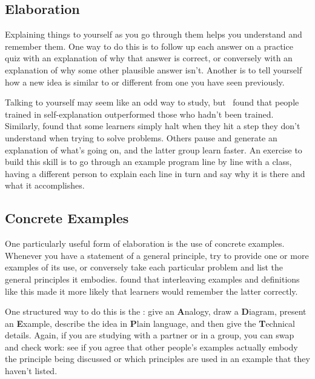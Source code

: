 \subsection*{Elaboration}

Explaining things to yourself as you go through them
helps you understand and remember them.
One way to do this is to follow up each answer on a practice quiz
with an explanation of why that answer is correct,
or conversely with an explanation of why some other plausible answer isn't.
Another is to tell yourself
how a new idea is similar to or different from one you have seen previously.

Talking to yourself may seem like an odd way to study,
but~\cite{Biel1995} found that
people trained in self-explanation outperformed those who hadn't been trained.
Similarly,
\cite{Chi1989} found that some learners simply halt when they hit a step they don't understand
when trying to solve problems.
Others pause and generate an explanation of what's going on,
and the latter group learn faster.
An exercise to build this skill is to go through an example program line by line with a class,
having a different person to explain each line in turn
and say why it is there and what it accomplishes.

\subsection*{Concrete Examples}

One particularly useful form of elaboration is the use of concrete examples.
Whenever you have a statement of a general principle,
try to provide one or more examples of its use,
or conversely take each particular problem and list the general principles it embodies.
\cite{Raws2014} found that interleaving examples and definitions like this
made it more likely that learners would remember the latter correctly.

One structured way to do this is
the :
give an \textbf{A}nalogy,
draw a \textbf{D}iagram,
present an \textbf{E}xample,
describe the idea in \textbf{P}lain language,
and then give the \textbf{T}echnical details.
Again,
if you are studying with a partner or in a group,
you can swap and check work:
see if you agree that other people's examples actually embody the principle being discussed
or which principles are used in an example that they haven't listed.

